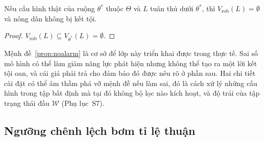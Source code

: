 \begin{proposition}
\label{prop:noalarm}
Nếu cấu hình thật của ruộng $\theta^{*}$ thuộc $\Theta$ và $L$ tuân thủ dưới
$\theta^{*}$, thì $V_{\mathrm{rob}}(L)=\emptyset$ và nông dân không bị kết tội.
\end{proposition}

\begin{proof}
$V_{\mathrm{rob}}(L)\subseteq V_{\theta^{*}}(L)=\emptyset$.
\end{proof}

Mệnh đề~\ref{prop:noalarm} là cơ sở để lớp này triển khai được trong thực tế. Sai
số mô hình có thể làm giảm năng lực phát hiện nhưng không thể tạo ra một lời kết
tội oan, và cái giá phải trả cho đảm bảo đó được nêu rõ ở phần sau. Hai chi tiết cài đặt có thể âm thầm phá vỡ mệnh đề nếu làm sai, đó là cách xử lý
những cấu hình trong tập bất định mà tại đó không bộ lọc nào kích hoạt, và độ trải
của tập trạng thái đầu $\mathcal{W}$ (Phụ lục~S7).

\subsection{Ngưỡng chênh lệch bơm tỉ lệ thuận}

